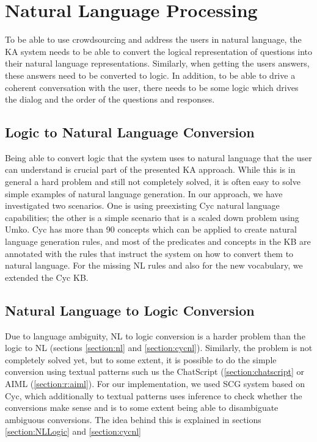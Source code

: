 \section{Natural Language Processing}
\label{section:bg:nlp}
To be able to use crowdsourcing and address the users in natural language, the 
KA system needs to be able to convert the logical representation of questions 
into their natural language representations. Similarly, when getting the users 
answers, these answers need to be converted to logic. In addition, to be 
able to drive a coherent conversation with the user, there needs to be some 
logic which drives the dialog and the order of the questions and responses.

\subsection{Logic to Natural Language Conversion}
Being able to convert logic that the system uses to natural language that the 
user can understand is crucial part of the presented KA approach. While this is 
in general a hard problem and still not completely solved, it is often easy to 
solve simple examples of natural language generation. In our approach, we have 
investigated two scenarios. One is using preexisting Cyc natural language 
capabilities; the other is a simple scenario that is a scaled down problem 
using Umko. Cyc has more than 90 concepts which can be applied to create 
natural language generation rules\parencite{Baxter2005}, and most of the 
predicates and concepts in the KB are annotated with the rules that instruct 
the system on how to convert them to natural language. For the missing NL 
rules and also for the new vocabulary, we extended the Cyc KB.

\subsection{Natural Language to Logic Conversion}
\label{section:bg:nlToLogic}
Due to language ambiguity, 
NL to logic conversion is a harder problem than the logic to NL
\parencite{Schneider2015} (sections \ref{section:nl} and \ref{section:cycnl}). 
Similarly, the problem is not completely solved yet, but to some extent, it is 
possible to do the simple conversion using textual patterns such us the 
ChatScript (\autoref{section:chatscript} or AIML (\autoref{section:r:aiml}). 
For our implementation, we used SCG system based on Cyc, which additionally to 
textual patterns uses 
inference to check whether the conversions make sense and is to some extent 
being able to disambiguate ambiguous conversions\parencite{Schneider2015}.
The idea behind this is explained in sections \ref{section:NLLogic} and
\ref{section:cycnl}

